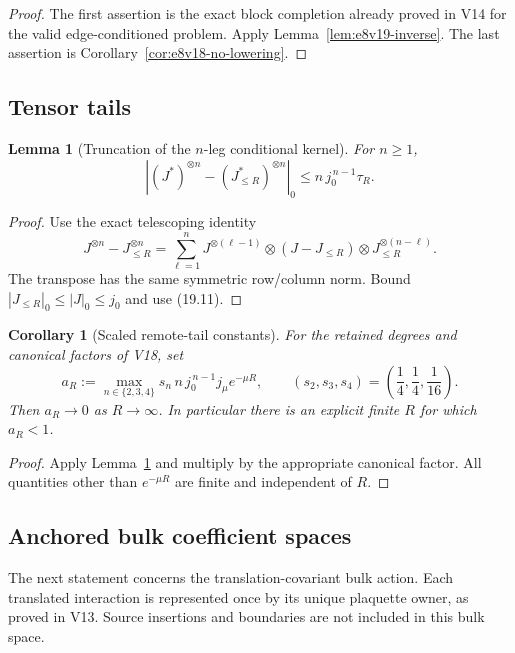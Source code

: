 \documentclass[11pt,oneside]{book}
\newtheorem{lemma}[theorem]{Lemma}
\newtheorem{corollary}[theorem]{Corollary}
\theoremstyle{definition}
\theoremstyle{remark}
\begin{document}
\begin{proof}
The first assertion is the exact block completion already proved in
V14 for the valid edge-conditioned problem.  Apply
Lemma~\ref{lem:e8v19-inverse}.  The last assertion is
Corollary~\ref{cor:e8v18-no-lowering}.
\end{proof}

\subsection{Tensor tails}

\begin{lemma}[Truncation of the \(n\)-leg conditional kernel]
\label{lem:e8v19-tensor-tail}
For \(n\geq1\),
\[
\left|
(J^*)^{\otimes n}-(J_{\leq R}^*)^{\otimes n}
\right|_0
\leq n\,j_0^{\,n-1}\tau_R.                       \tag{19.12}
\]
\end{lemma}

\begin{proof}
Use the exact telescoping identity
\[
J^{\otimes n}-J_{\leq R}^{\otimes n}
=\sum_{\ell=1}^n
J^{\otimes(\ell-1)}\otimes(J-J_{\leq R})
\otimes J_{\leq R}^{\otimes(n-\ell)}.
\]
The transpose has the same symmetric row/column norm.  Bound
\(|J_{\leq R}|_0\leq|J|_0\leq j_0\) and use (19.11).
\end{proof}

\begin{corollary}[Scaled remote-tail constants]
\label{cor:e8v19-aR}
For the retained degrees and canonical factors of V18, set
\[
 a_R:=
\max_{n\in\{2,3,4\}}
 s_n\,n\,j_0^{\,n-1}j_\mu e^{-\mu R},
\qquad
(s_2,s_3,s_4)=\left(\frac14,\frac14,\frac1{16}\right).             \tag{19.13}
\]
Then \(a_R\to0\) as \(R\to\infty\).  In particular there is an
explicit finite \(R\) for which \(a_R<1\).
\end{corollary}

\begin{proof}
Apply Lemma~\ref{lem:e8v19-tensor-tail} and multiply by the appropriate
canonical factor.  All quantities other than \(e^{-\mu R}\) are
finite and independent of \(R\).
\end{proof}

\subsection{Anchored bulk coefficient spaces}

The next statement concerns the translation-covariant bulk action.
Each translated interaction is represented once by its unique
plaquette owner, as proved in V13.  Source insertions and boundaries
are not included in this bulk space.
\end{document}
